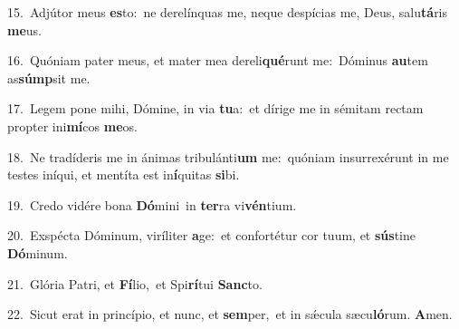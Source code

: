 {\numbfont\textcolor{\numbcolor}{15.}}~Adjútor meus \textbf{es}\-to:~\star ne derelínquas me, neque despícias me, Deus, salu\-\textbf{tá}\-ris \textbf{me}\-us.\par
{\numbfont\textcolor{\numbcolor}{16.}}~Quóniam pater meus, et mater mea dereli\-\textbf{qué}\-runt me:~\star Dóminus \textbf{au}\-tem as\-\textbf{súmp}\-sit me.\par
{\numbfont\textcolor{\numbcolor}{17.}}~Legem pone mihi, Dómine, in via \textbf{tu}\-a:~\star et dírige me in sémitam rectam propter ini\-\textbf{mí}\-cos \textbf{me}\-os.\par
{\numbfont\textcolor{\numbcolor}{18.}}~Ne tradíderis me in ánimas tribulánti\textbf{um} me:~\star quóniam insurrexérunt in me testes iníqui, et mentíta est in\-\textbf{í}\-quitas \textbf{si}\-bi.\par
{\numbfont\textcolor{\numbcolor}{19.}}~Credo vidére bona \textbf{Dó}\-mini~\star in \textbf{ter}\-ra vi\-\textbf{vén}\-tium.\par
{\numbfont\textcolor{\numbcolor}{20.}}~Exspécta Dóminum, viríliter \textbf{a}\-ge:~\star et confortétur cor tuum, et \textbf{sús}\-tine \textbf{Dó}\-minum.\par
{\numbfont\textcolor{\numbcolor}{21.}}~Glória Patri, et \textbf{Fí}\-lio,~\star et Spi\-\textbf{rí}\-tui \textbf{Sanc}\-to.\par
{\numbfont\textcolor{\numbcolor}{22.}}~Sicut erat in princípio, et nunc, et \textbf{sem}\-per,~\star et in sǽcula sæcu\-\textbf{ló}\-rum. \textbf{A}\-men.\par
